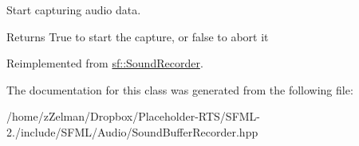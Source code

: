 Start capturing audio data. 

\begin{DoxyReturn}{Returns}
True to start the capture, or false to abort it 
\end{DoxyReturn}


Reimplemented from \hyperlink{classsf_1_1SoundRecorder_a7af418fb036201d3f85745bef78ce77f}{sf\-::\-Sound\-Recorder}.



The documentation for this class was generated from the following file\-:\begin{DoxyCompactItemize}
\item 
/home/z\-Zelman/\-Dropbox/\-Placeholder-\/\-R\-T\-S/\-S\-F\-M\-L-\/2./include/\-S\-F\-M\-L/\-Audio/Sound\-Buffer\-Recorder.\-hpp\end{DoxyCompactItemize}

